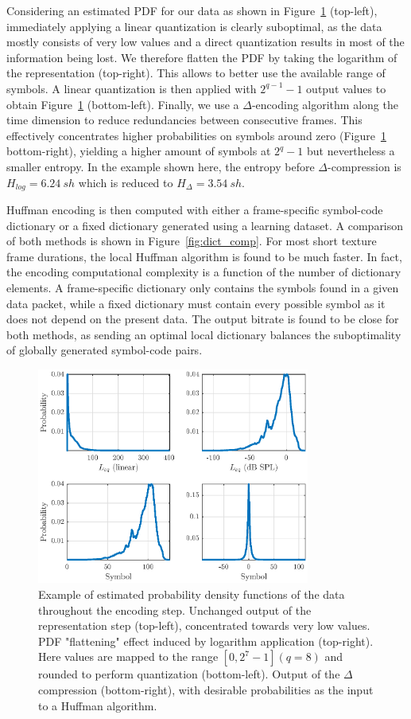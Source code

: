 \documentclass[sensors,article,submit,moreauthors,pdftex,10pt,a4paper]{mdpi}
\begin{document}
Considering an estimated PDF for our data as shown in Figure~\ref{fig:pdf} (top-left), immediately applying a linear quantization is clearly suboptimal, as the data mostly consists of very low values and a direct quantization results in most of the information being lost. We therefore flatten the PDF by taking the logarithm of the representation (top-right). This allows to better use the available range of symbols. A linear quantization is then applied with $2^{q-1}-1$ output values to obtain Figure~\ref{fig:pdf} (bottom-left). Finally, we use a $\Delta$-encoding algorithm along the time dimension to reduce redundancies between consecutive frames. This effectively concentrates higher probabilities on symbols around zero (Figure~\ref{fig:pdf} bottom-right), yielding a higher amount of symbols at $2^q-1$ but nevertheless a smaller entropy. In the example shown here, the entropy before $\Delta$-compression is $H_{log} = 6.24~sh$ which is reduced to $H_{\Delta} = 3.54~sh$.

Huffman encoding is then computed with either a frame-specific symbol-code dictionary or a fixed dictionary generated using a learning dataset. A comparison of both methods is shown in Figure~\ref{fig:dict_comp}. For most short texture frame durations, the local Huffman algorithm is found to be much faster. In fact, the encoding computational complexity is a function of the number of dictionary elements. A frame-specific dictionary only contains the symbols found in a given data packet, while a fixed dictionary must contain every possible symbol as it does not depend on the present data. The output bitrate is found to be close for both methods, as sending an optimal local dictionary balances the suboptimality of globally generated symbol-code pairs.\\

\begin{figure}[htbp]
	\centering
		\includegraphics[width=0.8\textwidth]{figures/pdf.eps}
	\caption{Example of estimated probability density functions of the data throughout the encoding step. Unchanged output of the representation step (top-left), concentrated towards very low values. PDF "flattening" effect induced by logarithm application (top-right). Here values are mapped to the range $[0, 2^7-1] (q=8)$ and rounded to perform quantization (bottom-left). Output of the $\Delta$ compression (bottom-right), with desirable probabilities as the input to a Huffman algorithm.}
	\label{fig:pdf}
\end{figure}
\end{document}
